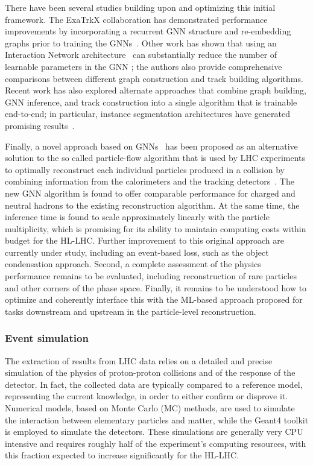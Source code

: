 There have been several studies building upon and optimizing this initial framework. 
The ExaTrkX collaboration has demonstrated performance improvements by incorporating a recurrent GNN structure \cite{exatrk_19} and re-embedding graphs prior to training the GNNs~\cite{embedding}. 
Other work has shown that using an Interaction Network architecture~\cite{battaglia2016interaction} can substantially reduce the number of learnable parameters in the GNN \cite{dezoort2021charged}; the authors also provide comprehensive comparisons between different graph construction and track building algorithms. 
Recent work has also explored alternate approaches that combine graph building, GNN inference, and track construction into a single algorithm that is trainable end-to-end; in particular, instance segmentation architectures have generated promising results~\cite{thais2021instance}.

Finally, a novel approach based on GNNs~\cite{Pata:2021oez} has been proposed as an alternative solution to the so called particle-flow algorithm that is used by LHC experiments to optimally reconstruct each individual particles produced in a collision by combining information from the calorimeters and the tracking detectors~\cite{Sirunyan:2017ulk}. The new GNN algorithm is found to offer comparable performance for charged and neutral hadrons to the existing reconstruction algorithm. 
At the same time, the inference time is found to scale approximately linearly with the particle multiplicity, which is promising for its ability to maintain computing costs within budget for the HL-LHC. 
Further improvement to this original approach are currently under study, including an event-based loss, such as the object condensation approach. 
Second, a complete assessment of the physics performance remains to be evaluated,  including reconstruction of rare particles and other corners of the phase space. 
Finally, it remains to be understood how to optimize and coherently interface this with the ML-based approach proposed for tasks downstream and upstream in the particle-level reconstruction.

\subsubsection{Event simulation}
\label{sec:lhceventsim}

The extraction of results from LHC data relies on a detailed and precise simulation of the physics of proton-proton collisions and of the response of the detector. 
In fact, the collected data are typically compared to a reference model, representing the current knowledge, in order to either confirm or disprove it. Numerical models, based on Monte Carlo (MC) methods, are used to simulate the interaction between elementary particles and matter, while the Geant4 toolkit is employed to simulate the detectors. These simulations are generally very CPU intensive and requires roughly half of the experiment’s computing resources, with this fraction expected to increase significantly for the HL-LHC. 

